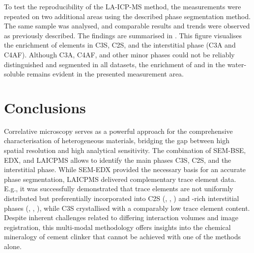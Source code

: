 To test the reproducibility of the LA-ICP-MS method, the measurements were repeated on two additional areas using the described phase segmentation method.
The same sample was analysed, and comparable results and trends were observed as previously described.
The findings are summarised in .
This figure visualises the enrichment of elements in \ac{C3S}, \ac{C2S}, and the interstitial phase (\ac{C3A} and \ac{C4AF}).
Although \ac{C3A}, \ac{C4AF}, and other minor phases could not be reliably distinguished and segmented in all datasets, the enrichment of  and  in the water-soluble  remains evident in the presented measurement area.

\section{Conclusions}

Correlative microscopy serves as a powerful approach for the comprehensive characterisation of heterogeneous materials, bridging the gap between high spatial resolution and high analytical sensitivity.
The combination of \ac{SEM}-\ac{BSE}, \ac{EDX}, and \ac{LAICPMS} allows to identify the main phases \ac{C3S}, \ac{C2S}, and the interstitial phase. 
While \ac{SEM}-\ac{EDX} provided the necessary basis for an accurate phase segmentation, \ac{LAICPMS} delivered complementary trace element data.
E.g., it was successfully demonstrated that trace elements are not uniformly distributed but preferentially incorporated into \ac{C2S} (, , ) and -rich interstitial phases (, , ), while \ac{C3S} crystallised with a comparably low trace element content.
Despite inherent challenges related to differing interaction volumes and image registration, this multi-modal methodology offers insights into the chemical mineralogy of cement clinker that cannot be achieved with one of the methods alone.
